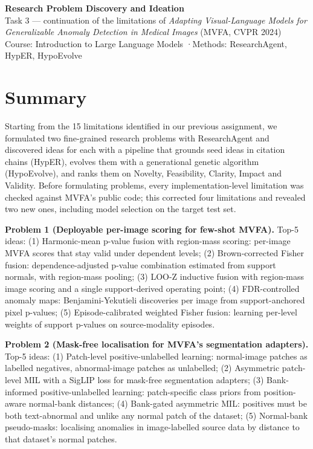 \documentclass[11pt,a4paper]{article}
\begin{document}
\begin{center}
{\sffamily\bfseries\huge Research Problem Discovery and Ideation}\\[4pt]
{\sffamily\large Task 3 — continuation of the limitations of \emph{Adapting Visual-Language Models for Generalizable Anomaly Detection in Medical Images} (MVFA, CVPR 2024)}\\[6pt]
{\color{muted}Course: Introduction to Large Language Models \quad·\quad Methods: ResearchAgent, HypER, HypoEvolve}
\end{center}
\vspace{4pt}
\section*{Summary}
Starting from the 15 limitations identified in our previous assignment, we formulated two fine-grained research problems with ResearchAgent and discovered ideas for each with a pipeline that grounds seed ideas in citation chains (HypER), evolves them with a generational genetic algorithm (HypoEvolve), and ranks them on Novelty, Feasibility, Clarity, Impact and Validity. Before formulating problems, every implementation-level limitation was checked against MVFA's public code; this corrected four limitations and revealed two new ones, including model selection on the target test set.

\textbf{Problem 1 (Deployable per-image scoring for few-shot MVFA).} Top-5 ideas: (1) Harmonic-mean p-value fusion with region-mass scoring: per-image MVFA scores that stay valid under dependent levels; (2) Brown-corrected Fisher fusion: dependence-adjusted p-value combination estimated from support normals, with region-mass pooling; (3) LOO-Z inductive fusion with region-mass image scoring and a single support-derived operating point; (4) FDR-controlled anomaly maps: Benjamini-Yekutieli discoveries per image from support-anchored pixel p-values; (5) Episode-calibrated weighted Fisher fusion: learning per-level weights of support p-values on source-modality episodes.

\textbf{Problem 2 (Mask-free localisation for MVFA's segmentation adapters).} Top-5 ideas: (1) Patch-level positive-unlabelled learning: normal-image patches as labelled negatives, abnormal-image patches as unlabelled; (2) Asymmetric patch-level MIL with a SigLIP loss for mask-free segmentation adapters; (3) Bank-informed positive-unlabelled learning: patch-specific class priors from position-aware normal-bank distances; (4) Bank-gated asymmetric MIL: positives must be both text-abnormal and unlike any normal patch of the dataset; (5) Normal-bank pseudo-masks: localising anomalies in image-labelled source data by distance to that dataset's normal patches.
\end{document}
